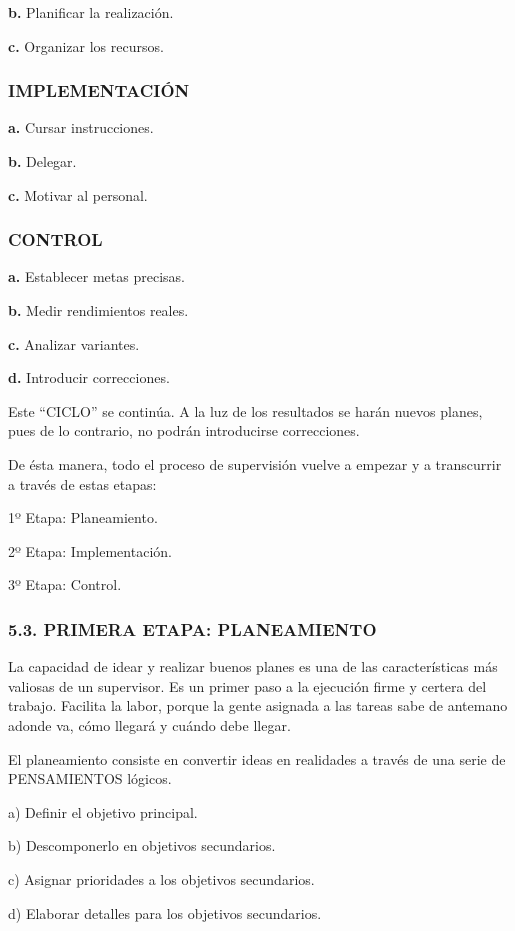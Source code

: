 \textbf{b. }Planificar la realización.

\textbf{c. }Organizar los recursos.

\subsubsection*{IMPLEMENTACIÓN}
\textbf{a. }Cursar instrucciones.

\textbf{b. }Delegar.

\textbf{c. }Motivar al personal.

\subsubsection*{CONTROL}
\textbf{a. }Establecer metas precisas.

\textbf{b. }Medir rendimientos reales.

\textbf{c. }Analizar variantes.

\textbf{d. }Introducir correcciones.

Este “CICLO” se continúa. A la luz de los resultados se harán nuevos planes, pues de lo contrario, no podrán introducirse correcciones.

De ésta manera, todo el proceso de supervisión vuelve a empezar y a transcurrir a través de estas etapas:

1º Etapa: Planeamiento.

2º Etapa: Implementación.

3º Etapa: Control.

\subsubsection*{5.3. PRIMERA ETAPA: PLANEAMIENTO}
La capacidad de idear y realizar buenos planes es una de las características más valiosas de un supervisor. Es un primer paso a la ejecución firme y certera del trabajo. Facilita la labor, porque la gente asignada a las tareas sabe de antemano adonde va, cómo llegará y cuándo debe llegar.

El planeamiento consiste en convertir ideas en realidades a través de una serie de PENSAMIENTOS lógicos.

a) Definir el objetivo principal.



b) Descomponerlo en objetivos secundarios.

c) Asignar prioridades a los objetivos secundarios.

d) Elaborar detalles para los objetivos secundarios.

